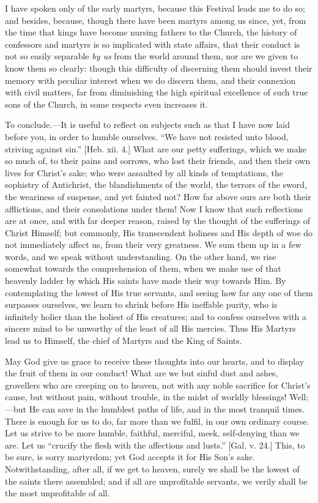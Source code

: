 I have spoken only of the early martyrs, because this Festival
leads me to do so; and besides, because, though there have been
martyrs among us since, yet, from the time that kings have become
nursing fathers to the Church, the history of confessors and martyrs
is so implicated with state affairs, that their conduct is not so
easily separable \emph{by us} from the world around them, nor are we
given to know them so clearly: though this difficulty of discerning
them should invest their memory with peculiar interest when we do
discern them, and their connexion with civil matters, far from
diminishing the high spiritual excellence of such true sons of the
Church, in some respects even increases it.

To conclude.—It is useful to reflect on subjects such as that I
have now laid before you, in order to humble ourselves. ``We have
not resisted unto blood, striving against sin.'' [Heb. xii. 4.]
What are our petty sufferings, which we make so much of, to their
pains and sorrows, who lost their friends, and then their own lives
for Christ's sake; who were assaulted by all kinds of temptations, the
sophistry of Antichrist, the blandishments of the world, the terrors
of the sword, the weariness of suspense, and yet fainted not? How far
above ours are both their afflictions, and their consolations under
them! Now I know that such reflections are at once, and with far
deeper reason, raised by the thought of the sufferings of Christ
Himself; but commonly, His transcendent holiness and His depth of woe
do not immediately affect us, from their very greatness. We sum them
up in a few words, and we speak without understanding. On the other
hand, we rise somewhat towards the comprehension of them, when we make
use of that heavenly ladder by which His saints have made their way
towards Him. By contemplating the lowest of His true servants, and
seeing how far any one of them surpasses ourselves, we learn to shrink
before His ineffable purity, who is infinitely holier than the holiest
of His creatures; and to confess ourselves with a sincere mind to be
unworthy of the least of all His mercies. Thus His Martyrs lead us to
Himself, the chief of Martyrs and the King of Saints.

May God give us grace to receive these thoughts into our hearts,
and to display the fruit of them in our conduct! What are we but
sinful dust and ashes, grovellers who are creeping on to heaven, not
with any noble sacrifice for Christ's cause, but without pain, without
trouble, in the midst of worldly blessings! Well;—but He can save in
the humblest paths of life, and in the most tranquil times. There is
enough for us to do, far more than we fulfil, in our own ordinary
course. Let us strive to be more humble, faithful, merciful, meek,
self-denying than we are. Let us ``crucify the flesh with the
affections and lusts.'' [Gal. v. 24.] This, to be sure, is sorry
martyrdom; yet God accepts it for His Son's sake. Notwithstanding,
after all, if we get to heaven, surely we shall be the lowest of the
saints there assembled; and if all are unprofitable servants, we
verily shall be the most unprofitable of all.

